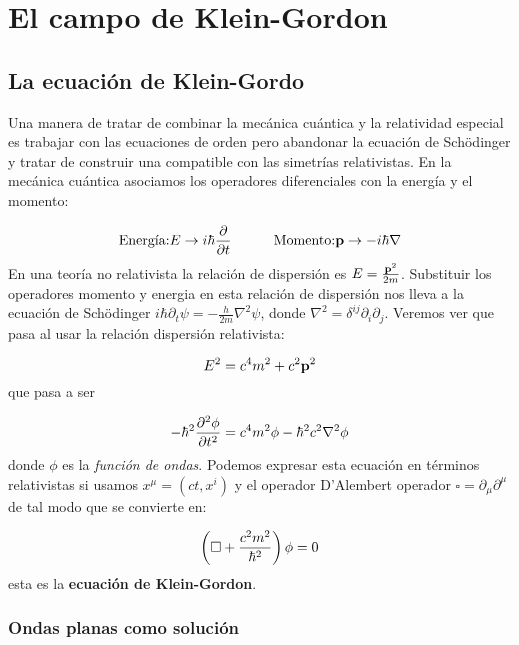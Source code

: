 \chapter{El campo de Klein-Gordon}

\section{La ecuación de Klein-Gordo}

Una manera de tratar de combinar la mecánica cuántica y la relatividad especial es trabajar con las ecuaciones de orden pero abandonar la ecuación de Schödinger y tratar de construir una compatible con las simetrías relativistas. En la mecánica cuántica asociamos los operadores diferenciales con la energía y el momento:

\begin{equation}
    \text{Energía:} E \rightarrow i \hbar \frac{\partial }{\partial t} \quad \quad \quad \text{Momento:} \mathbf{p} \rightarrow - i \hbar \nabla
\end{equation}
En una teoría no relativista la relación de dispersión es $E=\frac{\mathbf{p}^2}{2m}$. Substituir los operadores momento y energia en esta relación de dispersión nos lleva a la ecuación de Schödinger $i \hbar \partial_t \psi = - \frac{h}{2m} \nabla^2 \psi$, donde $\nabla^2 = \delta^{ij} \partial_i \partial_j$. Veremos ver que pasa al usar la relación dispersión relativista: 

\begin{equation}
    E^2 = c^4 m^2 + c^2 \mathbf{p}^2
\end{equation}
que pasa a ser

\begin{equation}
    - \hbar^2 \frac{\partial ^2 \phi}{\partial t^2} = c^4 m^2 \phi - \hbar^2 c^2 \nabla^2 \phi
\end{equation}
donde $\phi$ es la \textit{función de ondas}. Podemos expresar esta ecuación en términos relativistas si usamos $x^{\mu} = (ct,x^i)$ y el operador D'Alembert operador $\square = \partial_\mu \partial^\mu$ de tal modo que se convierte en:

\begin{equation}
    \left( \square + \frac{c^2 m^2}{\hbar^2} \right) \phi = 0 \label{Ec:03-01-004-KleinGordon}
\end{equation}
esta es la {\bf ecuación de Klein-Gordon}. 

\subsection{Ondas planas como solución}

